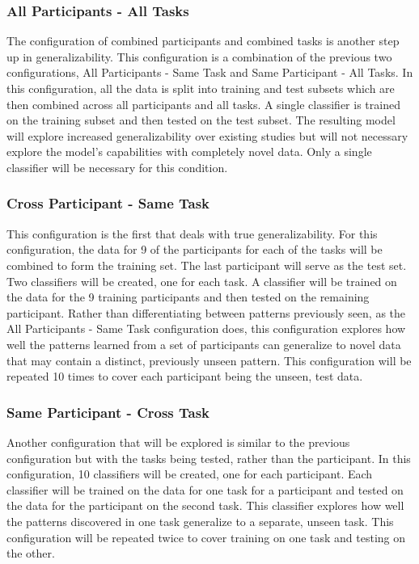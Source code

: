 \documentclass[11pt]{artikel3}
\begin{document}
\subsubsection{All Participants - All Tasks}
The configuration of combined participants and combined tasks is another step up in generalizability. This configuration is a combination of the previous two configurations, All Participants - Same Task and Same Participant - All Tasks. In this configuration, all the data is split into training and test subsets which are then combined across all participants and all tasks. A single classifier is trained on the training subset and then tested on the test subset. The resulting model will explore increased generalizability over existing studies but will not necessary explore the model’s capabilities with completely novel data. Only a single classifier will be necessary for this condition.

\subsubsection{Cross Participant - Same Task}
This configuration is the first that deals with true generalizability. For this configuration, the data for 9 of the participants for each of the tasks will be combined to form the training set. The last participant will serve as the test set. Two classifiers will be created, one for each task. A classifier will be trained on the data for the 9 training participants and then tested on the remaining participant. Rather than differentiating between patterns previously seen, as the All Participants - Same Task configuration does, this configuration explores how well the patterns learned from a set of participants can generalize to novel data that may contain a distinct, previously unseen pattern. This configuration will be repeated 10 times to cover each participant being the unseen, test data.

\subsubsection{Same Participant - Cross Task}
Another configuration that will be explored is similar to the previous configuration but with the tasks being tested, rather than the participant. In this configuration, 10 classifiers will be created, one for each participant. Each classifier will be trained on the data for one task for a participant and tested on the data for the participant on the second task. This classifier explores how well the patterns discovered in one task generalize to a separate, unseen task. This configuration will be repeated twice to cover training on one task and testing on the other.
\end{document}
